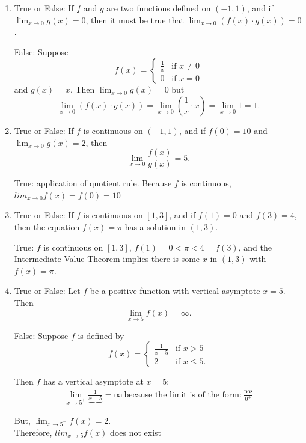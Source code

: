 \documentclass[nooutcomes]{ximera}
\begin{document}
\begin{problem}
	\begin{enumerate}
	\item  True or False: If $f$ and $g$ are two functions defined on $(-1, 1)$, and if $\displaystyle \lim_{x \to 0} g(x) = 0$, then it must be true that $\displaystyle \lim_{x \to 0} (f(x) \cdot g(x)) = 0$.
  \begin{freeResponse}
    False: Suppose 
    \[
      f(x) =
      \begin{cases}
        \frac{1}{x} & \mbox{if $x \ne 0$}\\
        0 & \mbox{if $x = 0$}
      \end{cases}
    \]
    and $g(x) = x$.
    Then $\lim_{x \to 0} g(x) = 0$ but
    \[
      \lim_{x \to 0} (f(x) \cdot g(x)) = \lim_{x \to 0} \left( \frac{1}{x} \cdot x \right) = \lim_{x \to 0} 1 = 1.
    \]
  \end{freeResponse}

  \item True or False: If $f$ is continuous on $(-1, 1)$, and if $f(0) = 10$ and $\displaystyle \lim_{x \to 0} g(x) = 2$, then
  \[
    \lim_{x \to 0} \frac{f(x)}{g(x)} = 5.
  \]
  \begin{freeResponse}
    True: application of quotient rule.  Because $f$ is continuous, $lim_{x \to 0} f(x)=f(0)=10$
  \end{freeResponse}

	\item  True or False: If $f$ is continuous on $[1, 3]$, and if $f(1) = 0$ and $f(3) = 4$, then the equation $f(x) = \pi$ has a solution in $(1, 3)$.
  \begin{freeResponse}
    True: $f$ is continuous on $[1, 3]$, $f(1) = 0 < \pi < 4 = f(3)$, and the Intermediate Value Theorem implies there is some $x$ in $(1, 3)$ with $f(x) = \pi$.
  \end{freeResponse}

  \item True or False: Let $f$ be a positive function with vertical asymptote $x = 5$. Then
  \[
    \lim_{x \to 5} f(x) = \infty.
  \]
  \begin{freeResponse}
    False: Suppose $f$ is defined by
    \[
      f(x) =
      \begin{cases}
        \frac{1}{x - 5} & \mbox{if $x > 5$}\\
        2 & \mbox{if $x \le 5$}.
      \end{cases}
    \]
    
    Then $f$ has a vertical asymptote at $x = 5$:
    \begin{align*}
      \lim_{x \to 5^+} \underbrace{\frac{1}{x-5}} = \infty\ \text{because the limit is of the form:}\ \frac{\text{pos}}{0^+}
    \end{align*}

    But, $\displaystyle \lim_{x \to 5^-} f(x) = 2$.\\
	Therefore, $lim_{x \to 5} f(x)$ does not exist

  \end{freeResponse}
\end{enumerate}
\end{problem}
\end{document}
